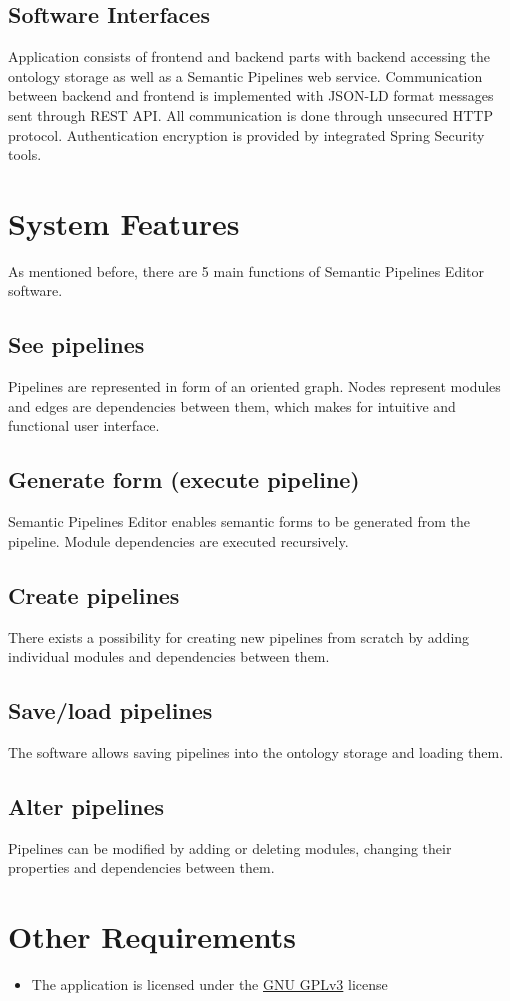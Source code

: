 \documentclass{article}
\begin{document}
\subsection{Software Interfaces}
Application consists of frontend and backend parts with backend accessing the ontology storage as well as a Semantic Pipelines web service. Communication between backend and frontend is implemented with JSON-LD format messages sent through REST API. All communication is done through unsecured HTTP protocol. Authentication encryption is provided by integrated Spring Security tools. 
\section{System Features}
\label{sec:features}
As mentioned before, there are 5 main functions of Semantic Pipelines Editor software.
\subsection{See pipelines}
Pipelines are represented in form of an oriented graph. Nodes represent modules and edges are dependencies between them, which makes for intuitive and functional user interface.
\subsection{Generate form (execute pipeline)}
Semantic Pipelines Editor enables semantic forms to be generated from the pipeline. Module dependencies are executed recursively.
\subsection{Create pipelines}
There exists a possibility for creating new pipelines from scratch by adding individual modules and dependencies between them.
\subsection{Save/load pipelines}
The software allows saving pipelines into the ontology storage and loading them.
\subsection{Alter pipelines}
Pipelines can be modified by adding or deleting modules, changing their properties and dependencies between them.
\section{Other Requirements}
\begin{itemize}
    \item The application is licensed under the \href{https://www.gnu.org/licenses/gpl.txt}{GNU GPLv3} license
\end{itemize}
\end{document}
